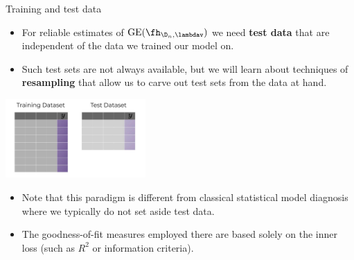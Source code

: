 \documentclass[11pt,compress,t,notes=noshow, xcolor=table]{beamer}
\begin{document}

\begin{vbframe}{Training and test data}

\begin{itemize}
  \item For reliable estimates of $\mathrm{GE}(\fh_{\D_n, \lambdav})$ we need 
  \textbf{test data} that are independent of the data we trained our model on.
  \item Such test sets are not always available, but we will learn about 
  techniques of \textbf{resampling} that allow us to carve out test sets from 
  the data at hand.
\end{itemize}

\begin{center}
  \includegraphics[width=0.4\textwidth]{figure_man/train-test-data.jpg}
\end{center}

\begin{itemize}
  \item Note that this paradigm is different from classical statistical model
  diagnosis where we typically do not set aside test data.
  \item The goodness-of-fit measures employed there are based solely on the 
  inner loss (such as $R^2$ or information criteria).
\end{itemize}

\end{vbframe}


\endlecture
\end{document}
